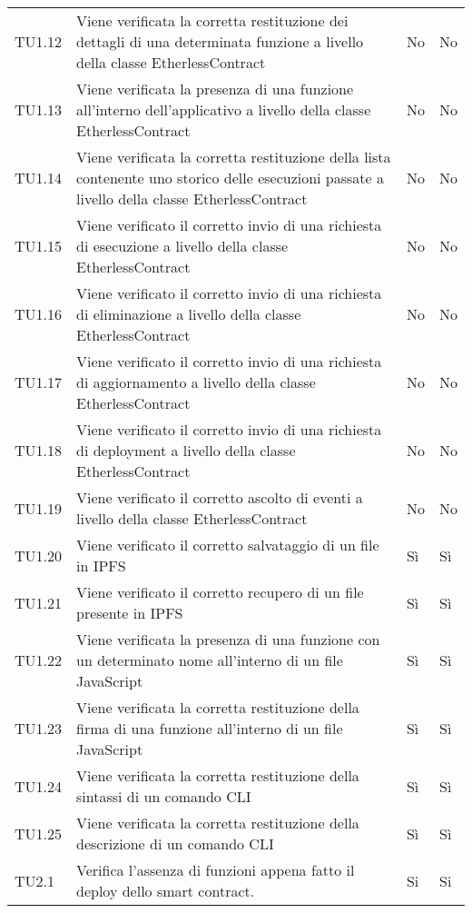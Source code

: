 \begin{longtable}{
		>{\centering}p{}
		>{}p{}
		>{\centering}p{}
		>{\centering}p{} }
		TU1.12 &
		Viene verificata la corretta restituzione dei dettagli di una determinata funzione a livello della classe EtherlessContract &
		No &
		No \tabularnewline

		TU1.13 &
		Viene verificata la presenza di una funzione all’interno dell’applicativo a livello della classe EtherlessContract &
		No &
		No \tabularnewline

		TU1.14 &
		Viene verificata la corretta restituzione della lista contenente uno storico delle esecuzioni passate a livello della classe EtherlessContract &
		No &
		No \tabularnewline

		TU1.15 &
		Viene verificato il corretto invio di una richiesta di esecuzione a livello della classe EtherlessContract &
		No &
		No \tabularnewline

		TU1.16 &
		Viene verificato il corretto invio di una richiesta di eliminazione a livello della classe EtherlessContract &
		No &
		No \tabularnewline

		TU1.17 &
		Viene verificato il corretto invio di una richiesta di aggiornamento a livello della classe EtherlessContract &
		No &
		No \tabularnewline

		TU1.18 &
		Viene verificato il corretto invio di una richiesta di deployment a livello della classe EtherlessContract &
		No &
		No \tabularnewline

		TU1.19 &
		Viene verificato il corretto ascolto di eventi a livello della classe EtherlessContract &
		No &
		No \tabularnewline

		TU1.20 &
		Viene verificato il corretto salvataggio di un file in IPFS &
		Sì &
		Sì \tabularnewline

		TU1.21 &
		Viene verificato il corretto recupero di un file presente in IPFS &
		Sì &
		Sì \tabularnewline

		TU1.22 &
		Viene verificata la presenza di una funzione con un determinato nome all’interno di un file JavaScript &
		Sì &
		Sì \tabularnewline

		TU1.23 &
		Viene verificata la corretta restituzione della firma di una funzione all’interno di un file JavaScript &
		Sì &
		Sì \tabularnewline

		TU1.24 &
		Viene verificata la corretta restituzione della sintassi di un comando CLI &
		Sì &
		Sì \tabularnewline

		TU1.25 &
		Viene verificata la corretta restituzione della descrizione di un comando CLI &
		Sì &
		Sì \tabularnewline
		
		
TU2.1   &  Verifica l'assenza di funzioni appena fatto il deploy dello smart contract. &
Si & Si \tabularnewline


\end{longtable}
